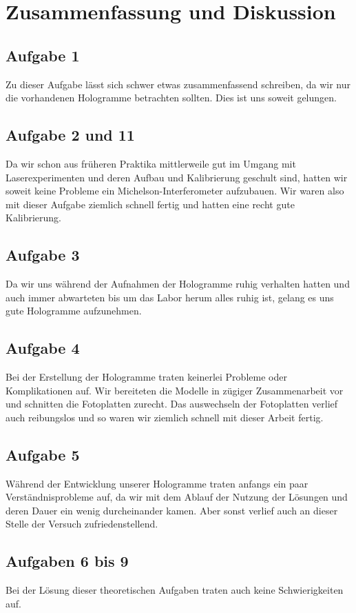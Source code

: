 \section{Zusammenfassung und Diskussion}

\subsection{Aufgabe 1}
Zu dieser Aufgabe lässt sich schwer etwas zusammenfassend schreiben, da wir nur die vorhandenen Hologramme betrachten sollten. Dies ist uns soweit gelungen.

\subsection{Aufgabe 2 und 11}
Da wir schon aus früheren Praktika mittlerweile gut im Umgang mit Laserexperimenten und deren Aufbau und Kalibrierung geschult sind, hatten wir soweit keine Probleme ein Michelson-Interferometer aufzubauen. Wir waren also mit dieser Aufgabe ziemlich schnell fertig und hatten eine recht gute Kalibrierung.

\subsection{Aufgabe 3}
Da wir uns während der Aufnahmen der Hologramme ruhig verhalten hatten und auch immer abwarteten  bis um das Labor herum alles ruhig ist, gelang es uns gute Hologramme aufzunehmen.

\subsection{Aufgabe 4}
Bei der Erstellung der Hologramme traten keinerlei Probleme oder Komplikationen auf. Wir bereiteten die Modelle in zügiger Zusammenarbeit vor und schnitten die Fotoplatten zurecht. Das auswechseln der Fotoplatten verlief auch reibungslos und so waren wir ziemlich schnell mit dieser Arbeit fertig.

\subsection{Aufgabe 5}
Während der Entwicklung unserer Hologramme traten anfangs ein paar Verständnisprobleme auf, da wir mit dem Ablauf der Nutzung der Lösungen und deren Dauer ein wenig durcheinander kamen. Aber sonst verlief auch an dieser Stelle der Versuch zufriedenstellend.

\subsection{Aufgaben 6 bis 9}
Bei der Lösung dieser theoretischen Aufgaben traten auch keine Schwierigkeiten auf.

